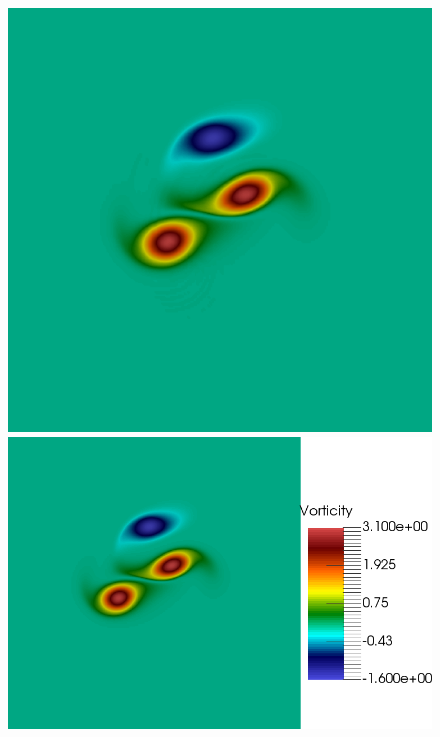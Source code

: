 \begin{figure}[h!]
\includegraphics[scale=0.06]{data/Incompressible_Euler/Snapshots/red_35_2.png}\hspace{1em}
\includegraphics[scale=0.06]{data/Incompressible_Euler/Snapshots/Full_2.png}\\


\end{figure}

